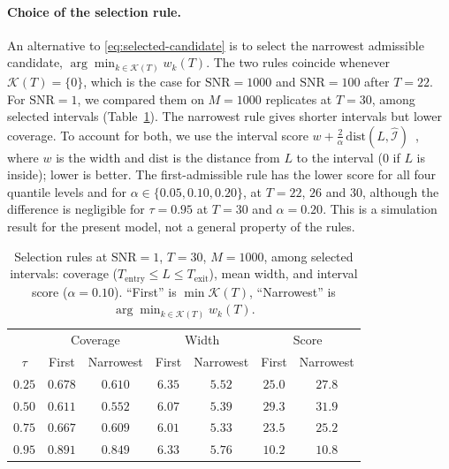 \documentclass[12pt,a4paper]{article}
\begin{document}
\paragraph{Choice of the selection rule.}
An alternative to \eqref{eq:selected-candidate} is to select the
narrowest admissible candidate,
$\arg\min_{k\in\mathcal K(T)}w_k(T)$. The two rules coincide whenever
$\mathcal K(T)=\{0\}$, which is the case for $\mathrm{SNR}=1000$ and
$\mathrm{SNR}=100$ after $T=22$. For $\mathrm{SNR}=1$, we compared them on
$M=1000$ replicates at $T=30$, among selected intervals
(Table~\ref{tab:rule_comparison}). The narrowest rule gives shorter
intervals but lower coverage. To account for both, we use the interval
score $w+\frac{2}{\alpha}\,\mathrm{dist}(L,\widehat{\mathcal I})$~\citep{Winkler1972,Gneiting2007}, where
$w$ is the width and $\mathrm{dist}$ is the distance from $L$ to the
interval ($0$ if $L$ is inside); lower is better. The first-admissible
rule has the lower score for all four quantile levels and for
$\alpha\in\{0.05,0.10,0.20\}$, at $T=22$, $26$ and $30$, although the
difference is negligible for $\tau=0.95$ at $T=30$ and $\alpha=0.20$.
This is a simulation result for the present model, not a general
property of the rules.

\begin{table}[htbp]
	\centering
	\caption{Selection rules at $\mathrm{SNR}=1$, $T=30$, $M=1000$,
		among selected intervals: coverage ($T_{\mathrm{entry}}\le L\le
		T_{\mathrm{exit}}$), mean width, and interval score
		($\alpha=0.10$). ``First'' is $\min\mathcal K(T)$, ``Narrowest''
		is $\arg\min_{k\in\mathcal K(T)} w_k(T)$.}
	\label{tab:rule_comparison}
	\begin{tabular}{ccccccc}
		\toprule
		& \multicolumn{2}{c}{Coverage} & \multicolumn{2}{c}{Width}
		& \multicolumn{2}{c}{Score} \\
		$\tau$ & First & Narrowest & First & Narrowest & First & Narrowest \\
		\midrule
		$0.25$ & $0.678$ & $0.610$ & $6.35$ & $5.52$ & $25.0$ & $27.8$ \\
		$0.50$ & $0.611$ & $0.552$ & $6.07$ & $5.39$ & $29.3$ & $31.9$ \\
		$0.75$ & $0.667$ & $0.609$ & $6.01$ & $5.33$ & $23.5$ & $25.2$ \\
		$0.95$ & $0.891$ & $0.849$ & $6.33$ & $5.76$ & $10.2$ & $10.8$ \\
		\bottomrule
	\end{tabular}
\end{table}
\end{document}
